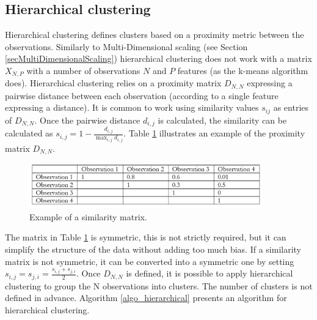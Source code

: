 \subsection{Hierarchical clustering} \label{secHierarchicalClustering}
Hierarchical clustering defines clusters based on a proximity metric between the observations. Similarly to Multi-Dimensional scaling (see Section \ref{secMultiDimensionalScaling}) hierarchical clustering does not work with a matrix $X_{N,P}$ with  a number of observations $N$ and $P$ features (as the k-means algorithm does). Hierarchical clustering relies on a proximity matrix $D_{N,N}$ expressing a pairwise distance between each observation (according to a single feature expressing a distance).  It is common to work using similarity values $s_{ij}$ as entries of $D_{N,N}$. Once the pairwise distance $d_{i,j}$ is calculated, the similarity can be calculated as $s_{i,j}=1-\frac{d_{i,j}}{\max_{i,j}{d_{i,j}}}$. Table \ref{tab_similarityMatrix} illustrates an example of the proximity matrix $D_{N,N}$.

\begin{figure}[hbt!]
\centering
\includegraphics[width=0.9\textwidth]{SectionLetsMath/unsupervisedLearning_figures/tab_similarityMatrix.png}
\captionsetup{type=table}
\caption{Example of a similarity matrix.}
\label{tab_similarityMatrix}
\end{figure}

The matrix in Table \ref{tab_similarityMatrix} is symmetric, this is not strictly required, but it can simplify the structure of the data without adding too much bias. If a similarity matrix is not symmetric, it can be converted into a symmetric one by setting $s_{i,j}=s_{j,i}=\frac{s_{i,j}+s_{j,i}}{2}$. Once $D_{N,N}$ is defined, it is possible to apply hierarchical clustering to group the N observations into clusters. The number of clusters is not defined in advance. Algorithm \ref{algo_hierarchical} presents an algorithm for hierarchical clustering.

